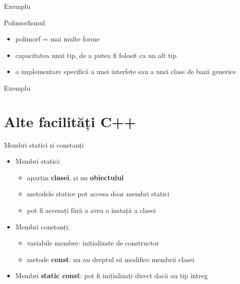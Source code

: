\documentclass{beamer}
\begin{document}
\begin{frame}{Exemplu}
  \footnotesize{}
\end{frame}

\begin{frame}{Polimorfismul}
  \begin{itemize}
  \item polimorf = mai multe forme 
  \item capacitatea unui tip, de a putea fi folosit ca un alt tip
  \item o implementare specifică a unei interfețe sau a unei clase de bază generice
  \end{itemize}
\end{frame}

\begin{frame}{Exemplu}
  \footnotesize{}
\end{frame}

\section{Alte facilități C++}

\begin{frame}{Membri statici și constanți}
 \begin{itemize}
  \item Membri statici:
  \begin{itemize}
  \item aparțin \textbf{clasei}, și nu \textbf{obiectului}
  \item metodele statice pot accesa doar membri statici
  \item pot fi accesați fără a avea o instață a clasei
  \end{itemize}       
  \item Membri constanți: 
   \begin{itemize}
    \item variabile membre: inițializate de constructor
	\item metode \textbf{const}: nu au dreptul să modifice membrii clasei
   \end{itemize}
   \item Membri \textbf{static const}: pot fi inițializați direct dacă au tip întreg
   \end{itemize}
\end{frame}
\end{document}
